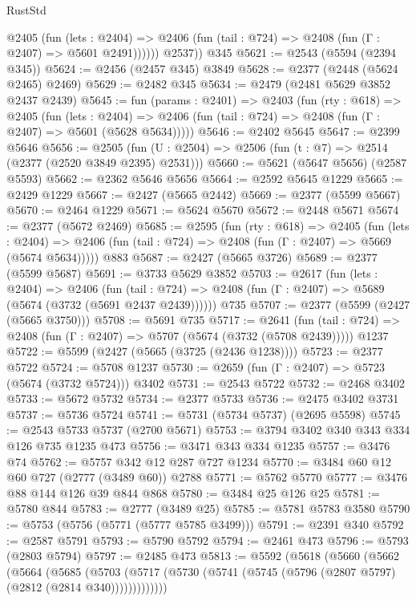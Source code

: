 \begin{lexlean}{RustStd}
\begin{coremodule}
            @2405
              (fun (lets : @2404) =>
              @2406 (fun (tail : @724) => @2408 (fun (Γ : @2407) => @5601 @2491))))))
        @2537))
    @345
@5621 := @2543 (@5594 (@2394 @345))
@5624 := @2456 (@2457 @345) @3849
@5628 := @2377 (@2448 (@5624 @2465) @2469)
@5629 := @2482 @345
@5634 := @2479 (@2481 @5629 @3852 @2437 @2439)
@5645 := fun (params : @2401) =>
  @2403
    (fun (rty : @618) =>
    @2405
      (fun (lets : @2404) =>
      @2406 (fun (tail : @724) => @2408 (fun (Γ : @2407) => @5601 (@5628 @5634)))))
@5646 := @2402 @5645
@5647 := @2399 @5646
@5656 := @2505 (fun (U : @2504) => @2506 (fun (t : @7) => @2514 (@2377 (@2520 @3849 @2395) @2531)))
@5660 := @5621 (@5647 @5656) (@2587 @5593)
@5662 := @2362 @5646 @5656
@5664 := @2592 @5645 @1229
@5665 := @2429 @1229
@5667 := @2427 (@5665 @2442)
@5669 := @2377 (@5599 @5667)
@5670 := @2464 @1229
@5671 := @5624 @5670
@5672 := @2448 @5671
@5674 := @2377 (@5672 @2469)
@5685 := @2595
    (fun (rty : @618) =>
    @2405
      (fun (lets : @2404) =>
      @2406 (fun (tail : @724) => @2408 (fun (Γ : @2407) => @5669 (@5674 @5634)))))
    @883
@5687 := @2427 (@5665 @3726)
@5689 := @2377 (@5599 @5687)
@5691 := @3733 @5629 @3852
@5703 := @2617
    (fun (lets : @2404) =>
    @2406
      (fun (tail : @724) => @2408 (fun (Γ : @2407) => @5689 (@5674 (@3732 (@5691 @2437 @2439))))))
    @735
@5707 := @2377 (@5599 (@2427 (@5665 @3750)))
@5708 := @5691 @735
@5717 := @2641
    (fun (tail : @724) => @2408 (fun (Γ : @2407) => @5707 (@5674 (@3732 (@5708 @2439)))))
    @1237
@5722 := @5599 (@2427 (@5665 (@3725 (@2436 @1238))))
@5723 := @2377 @5722
@5724 := @5708 @1237
@5730 := @2659 (fun (Γ : @2407) => @5723 (@5674 (@3732 @5724))) @3402
@5731 := @2543 @5722
@5732 := @2468 @3402
@5733 := @5672 @5732
@5734 := @2377 @5733
@5736 := @2475 @3402 @3731
@5737 := @5736 @5724
@5741 := @5731 (@5734 @5737) (@2695 @5598)
@5745 := @2543 @5733 @5737 (@2700 @5671)
@5753 := @3794 @3402 @340 @343 @334 @126 @735 @1235 @473
@5756 := @3471 @343 @334 @1235
@5757 := @3476 @74
@5762 := @5757 @342 @12 @287 @727 @1234
@5770 := @3484 @60 @12 @60 @727 (@2777 (@3489 @60)) @2788
@5771 := @5762 @5770
@5777 := @3476 @88 @144 @126 @39 @844 @868
@5780 := @3484 @25 @126 @25
@5781 := @5780 @844
@5783 := @2777 (@3489 @25)
@5785 := @5781 @5783 @3580
@5790 := @5753 (@5756 (@5771 (@5777 @5785 @3499)))
@5791 := @2391 @340
@5792 := @2587 @5791
@5793 := @5790 @5792
@5794 := @2461 @473
@5796 := @5793 (@2803 @5794)
@5797 := @2485 @473
@5813 := @5592
    (@5618
      (@5660
        (@5662
          (@5664
            (@5685
              (@5703
                (@5717 (@5730 (@5741 (@5745 (@5796 (@2807 @5797) (@2812 (@2814 @340)))))))))))))

\end{coremodule}
\end{lexlean}
